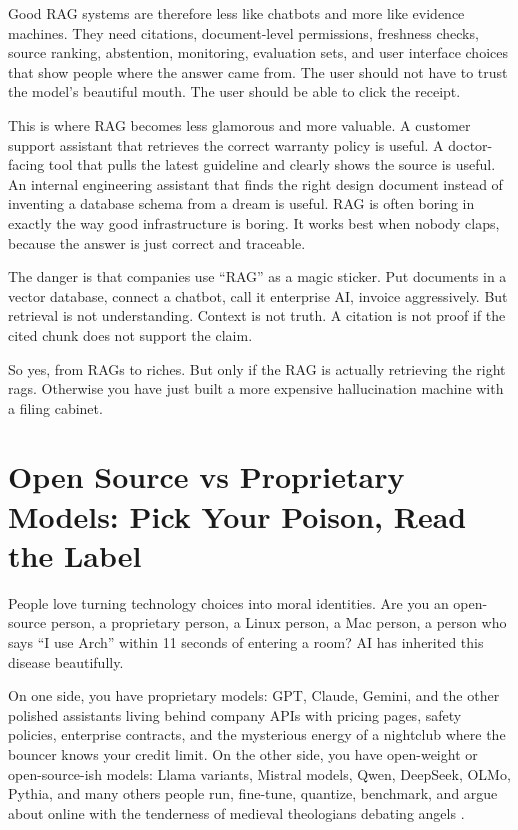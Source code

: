 \documentclass[12pt,oneside]{book}
\begin{document}
Good RAG systems are therefore less like chatbots and more like evidence machines. They need citations, document-level permissions, freshness checks, source ranking, abstention, monitoring, evaluation sets, and user interface choices that show people where the answer came from. The user should not have to trust the model's beautiful mouth. The user should be able to click the receipt.

This is where RAG becomes less glamorous and more valuable. A customer support assistant that retrieves the correct warranty policy is useful. A doctor-facing tool that pulls the latest guideline and clearly shows the source is useful. An internal engineering assistant that finds the right design document instead of inventing a database schema from a dream is useful. RAG is often boring in exactly the way good infrastructure is boring. It works best when nobody claps, because the answer is just correct and traceable.

The danger is that companies use ``RAG'' as a magic sticker. Put documents in a vector database, connect a chatbot, call it enterprise AI, invoice aggressively. But retrieval is not understanding. Context is not truth. A citation is not proof if the cited chunk does not support the claim.

So yes, from RAGs to riches. But only if the RAG is actually retrieving the right rags. Otherwise you have just built a more expensive hallucination machine with a filing cabinet.

\chapter{Open Source vs Proprietary Models: Pick Your Poison, Read the Label}

People love turning technology choices into moral identities. Are you an open-source person, a proprietary person, a Linux person, a Mac person, a person who says ``I use Arch'' within 11 seconds of entering a room? AI has inherited this disease beautifully.

On one side, you have proprietary models: GPT, Claude, Gemini, and the other polished assistants living behind company APIs with pricing pages, safety policies, enterprise contracts, and the mysterious energy of a nightclub where the bouncer knows your credit limit. On the other side, you have open-weight or open-source-ish models: Llama variants, Mistral models, Qwen, DeepSeek, OLMo, Pythia, and many others people run, fine-tune, quantize, benchmark, and argue about online with the tenderness of medieval theologians debating angels \parencite{touvron2023llama,jiang2023mistral,biderman2023,groeneveld2024}.
\end{document}
